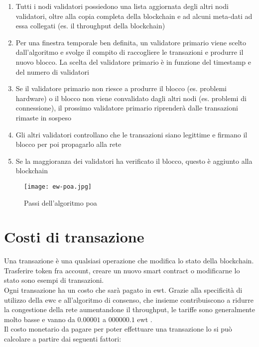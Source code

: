 \begin{enumerate}
    \item Tutti i nodi validatori possiedono una lista aggiornata degli altri nodi validatori, oltre alla copia completa della blockchain e ad alcuni meta-dati ad essa collegati (es. il throughput della blockchain)
    \item Per una finestra temporale ben definita, un validatore primario viene scelto dall'algoritmo e svolge il compito di raccogliere le transazioni e produrre il nuovo blocco. La scelta del validatore primario è in funzione del timestamp e del numero di validatori
    \item Se il validatore primario non riesce a produrre il blocco (es. problemi hardware) o il blocco non viene convalidato dagli altri nodi (es. problemi di connessione), il prossimo validatore primario riprenderà dalle transazioni rimaste in sospeso
    \item Gli altri validatori controllano che le transazioni siano legittime e firmano il blocco per poi propagarlo alla rete
    \item Se la maggioranza dei validatori ha verificato il blocco, questo è aggiunto alla blockchain
\end{enumerate}


\begin{figure}[ht]
    \texttt{[image: ew-poa.jpg]}
    \centering
    \caption{Passi dell'algoritmo \gls{poa} \cite{img:ew-poa}}
    \label{lab:ew-poa}
\end{figure}


\section{Costi di transazione}
Una transazione è una qualsiasi operazione che modifica lo stato della blockchain. Trasferire token fra account, creare un nuovo smart contract o modificarne lo stato sono esempi di transazioni. \\
Ogni transazione ha un costo che sarà pagato in \gls{ewt}.
Grazie alla specificità di utilizzo della \gls{ewc} e all'algoritmo di consenso, che insieme contribuiscono a ridurre la congestione della rete aumentandone il throughput, 
le tariffe sono generalmente molto basse e vanno da $0.00001$ a $000000.1$ \gls{ewt} \cite{art:manage-costs}. \\
Il costo monetario da pagare per poter effettuare una transazione lo si può calcolare a partire dai seguenti fattori:

